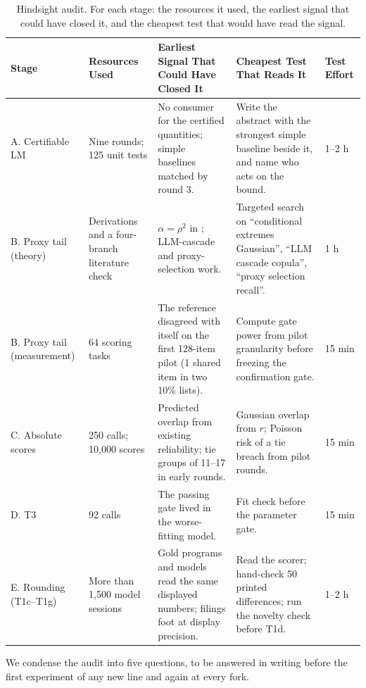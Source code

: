 \documentclass[11pt]{article}
\begin{document}
\begin{table}[!t]
\centering
\scriptsize
\renewcommand{\arraystretch}{1.18}
\begin{tabularx}{\textwidth}{@{}L{1.75cm}L{3.0cm}YYL{1.4cm}@{}}
\toprule
\textbf{Stage} & \textbf{Resources Used} & \textbf{Earliest Signal That Could Have Closed It} & \textbf{Cheapest Test That Reads It} & \textbf{Test Effort} \\
\midrule
A. Certifiable LM & Nine rounds; 125 unit tests & No consumer for the certified quantities; simple baselines matched by round 3. & Write the abstract with the strongest simple baseline beside it, and name who acts on the bound. & 1--2 h \\
B. Proxy tail (theory) & Derivations and a four-branch literature check & $\alpha=\rho^2$ in \citet{heffernan2004conditional}; LLM-cascade and proxy-selection work. & Targeted search on ``conditional extremes Gaussian'', ``LLM cascade copula'', ``proxy selection recall''. & 1 h \\
B. Proxy tail (measurement) & 64 scoring tasks & The reference disagreed with itself on the first 128-item pilot (1 shared item in two 10\% lists). & Compute gate power from pilot granularity before freezing the confirmation gate. & 15 min \\
C. Absolute scores & 250 calls; 10,000 scores & Predicted overlap from existing reliability; tie groups of 11--17 in early rounds. & Gaussian overlap from $r$; Poisson risk of a tie breach from pilot rounds. & 15 min \\
D. T3 & 92 calls & The passing gate lived in the worse-fitting model. & Fit check before the parameter gate. & 15 min \\
E. Rounding (T1c--T1g) & More than 1,500 model sessions & Gold programs and models read the same displayed numbers; filings foot at display precision. & Read the scorer; hand-check 50 printed differences; run the novelty check before T1d. & 1--2 h \\
\bottomrule
\end{tabularx}
\caption{Hindsight audit. For each stage: the resources it used, the earliest signal that could have closed it, and the cheapest test that would have read the signal.}
\label{tab:audit}
\end{table}

We condense the audit into five questions, to be answered in writing before the first experiment of any new line and again at every fork.
\end{document}
